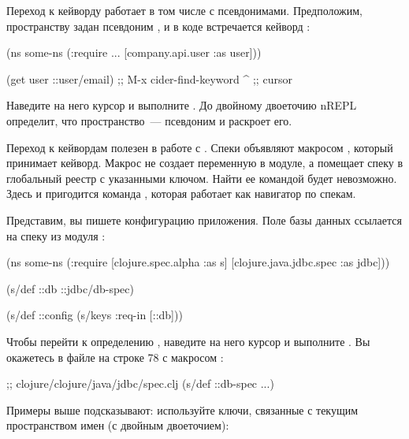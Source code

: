 Переход к кейворду работает в том числе с псевдонимами. Предположим, пространству  задан псевдоним , и в коде встречается кейворд :

\begin{english}
  \begin{clojure}
(ns some-ns
  (:require
   ...
   [company.api.user :as user]))

(get user ::user/email) ;; M-x cider-find-keyword
                ^       ;; cursor
  \end{clojure}
\end{english}

Наведите на него курсор и выполните . До двойному двоеточию nREPL определит, что пространство~--- псевдоним и раскроет его.

Переход к кейвордам полезен в работе с . Спеки объявляют макросом , который принимает кейворд. Макрос не создает переменную в модуле, а помещает спеку в глобальный реестр с указанными ключом. Найти ее командой  будет невозможно. Здесь и пригодится команда , которая работает как навигатор по спекам.

Представим, вы пишете конфигурацию приложения. Поле  базы данных ссылается на спеку из модуля :

\begin{english}
  \begin{clojure}
(ns some-ns
  (:require [clojure.spec.alpha :as s]
            [clojure.java.jdbc.spec :as jdbc]))

(s/def ::db ::jdbc/db-spec)

(s/def ::config
  (s/keys :req-in [::db]))
  \end{clojure}
\end{english}

Чтобы перейти к определению , наведите на него курсор и выполните . Вы окажетесь в файле  на строке 78 с макросом :

\begin{english}
  \begin{clojure}
;; clojure/clojure/java/jdbc/spec.clj
(s/def ::db-spec ...)
  \end{clojure}
\end{english}

Примеры выше подсказывают: используйте ключи, связанные с текущим пространством имен (с двойным двоеточием):


